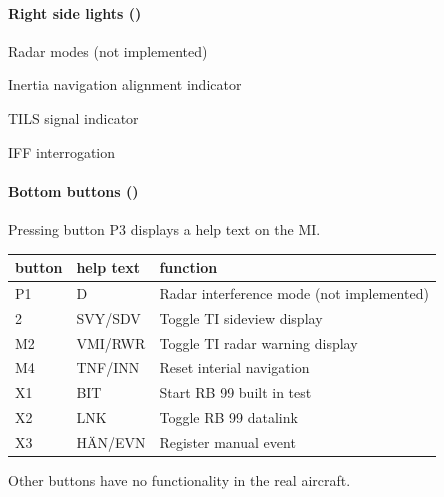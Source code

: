 \paragraph{Right side lights ()}
\begin{description}[nosep]
  \item[ID/J] Radar modes (not implemented)
  \item[TNF] Inertia navigation alignment indicator
  \item[TLS] TILS signal indicator
  \item[IK] IFF interrogation
\end{description}

\paragraph{Bottom buttons ()}
Pressing button P3 displays a help text on the MI.

\begin{tabular}{lll}
  button & help text & function \\
  \hline
  P1 & D       & Radar interference mode (not implemented) \\
  2  & SVY/SDV & Toggle TI sideview display \\
  M2 & VMI/RWR & Toggle TI radar warning display \\
  M4 & TNF/INN & Reset interial navigation \\
  X1 & BIT     & Start RB 99 built in test \\
  X2 & LNK     & Toggle RB 99 datalink \\
  X3 & HÄN/EVN & Register manual event
\end{tabular}

Other buttons have no functionality in the real aircraft.

